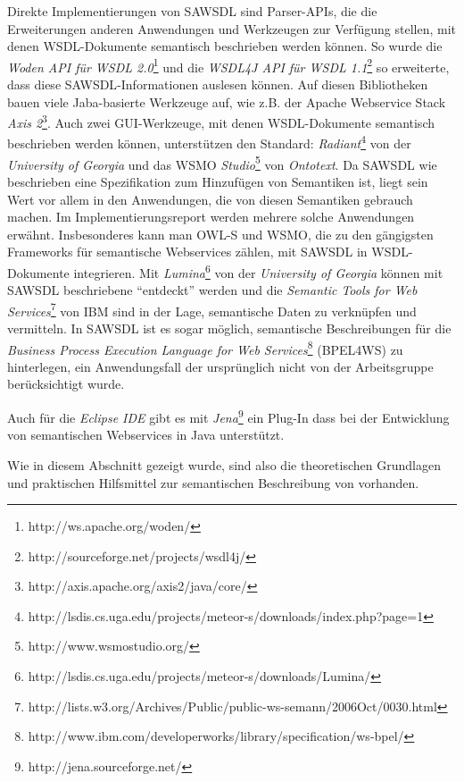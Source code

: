 Direkte Implementierungen von \ac{SAWSDL} sind Parser-\ac{API}s, die die Erweiterungen anderen Anwendungen und Werkzeugen zur Verfügung stellen, mit denen \ac{WSDL}-Dokumente semantisch beschrieben werden können. So wurde die \emph{Woden API für WSDL 2.0}\footnote{http://ws.apache.org/woden/} und die \emph{WSDL4J API für WSDL
1.1}\footnote{http://sourceforge.net/projects/wsdl4j/} so erweiterte, dass diese \ac{SAWSDL}-Informationen auslesen können. Auf diesen Bibliotheken bauen viele Jaba-basierte Werkzeuge auf, wie z.B. der Apache Webservice Stack \emph{Axis 2}\footnote{http://axis.apache.org/axis2/java/core/}. Auch zwei GUI-Werkzeuge, mit denen \ac{WSDL}-Dokumente semantisch beschrieben werden können, unterstützen den Standard: \emph{Radiant}\footnote{http://lsdis.cs.uga.edu/projects/meteor-s/downloads/index.php?page=1} von der \emph{University of Georgia} und das \acl{WSMO} \emph{Studio}\footnote{http://www.wsmostudio.org/} von \emph{Ontotext}. Da \ac{SAWSDL} wie beschrieben eine Spezifikation zum Hinzufügen von Semantiken ist, liegt sein Wert vor allem in den Anwendungen, die von diesen Semantiken gebrauch machen. Im Implementierungsreport werden mehrere solche Anwendungen erwähnt.
Insbesonderes kann man \ac{OWL-S} und \ac{WSMO}, die zu den gängigsten Frameworks für semantische Webservices zählen,  mit \ac{SAWSDL} in \ac{WSDL}-Dokumente integrieren. Mit \emph{Lumina}\footnote{http://lsdis.cs.uga.edu/projects/meteor-s/downloads/Lumina/} von der \emph{University of Georgia} können mit \ac{SAWSDL} beschriebene \ws "`entdeckt"' werden und die \emph{Semantic Tools for Web Services}\footnote{http://lists.w3.org/Archives/Public/public-ws-semann/2006Oct/0030.html} von IBM sind in der Lage, semantische Daten zu verknüpfen und vermitteln.
In \ac{SAWSDL} ist es sogar möglich, semantische Beschreibungen für die \emph{Business Process Execution Language for Web Services}\footnote{http://www.ibm.com/developerworks/library/specification/ws-bpel/} (BPEL4WS) zu hinterlegen, ein Anwendungsfall der ursprünglich nicht von der Arbeitsgruppe berücksichtigt wurde. \cite[S.63]{ky-sawsdl}

Auch für die \emph{Eclipse IDE} gibt es mit \emph{Jena}\footnote{http://jena.sourceforge.net/} ein Plug-In dass bei der Entwicklung von semantischen Webservices in Java unterstützt.

Wie in diesem Abschnitt gezeigt wurde, sind also die theoretischen Grundlagen und praktischen Hilfsmittel zur semantischen Beschreibung von \ws vorhanden.
